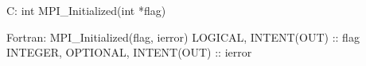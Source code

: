 C:
int MPI_Initialized(int *flag)

Fortran:
MPI_Initialized(flag, ierror)
LOGICAL, INTENT(OUT) :: flag
INTEGER, OPTIONAL, INTENT(OUT) :: ierror

